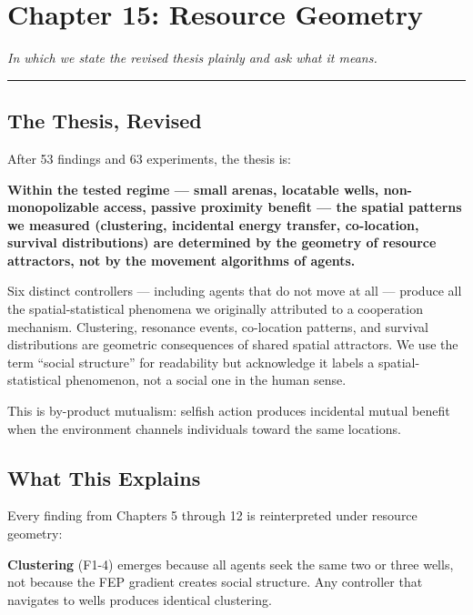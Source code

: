 \chapter{Chapter 15: Resource Geometry}\label{chapter-15-resource-geometry}

\emph{In which we state the revised thesis plainly and ask what it means.}

\begin{center}\rule{0.5\linewidth}{0.5pt}\end{center}

\section{The Thesis, Revised}\label{the-thesis-revised}

After 53 findings and 63 experiments, the thesis is:

\textbf{Within the tested regime --- small arenas, locatable wells, non-monopolizable access, passive proximity benefit --- the spatial patterns we measured (clustering, incidental energy transfer, co-location, survival distributions) are determined by the geometry of resource attractors, not by the movement algorithms of agents.}

Six distinct controllers --- including agents that do not move at all --- produce all the spatial-statistical phenomena we originally attributed to a cooperation mechanism. Clustering, resonance events, co-location patterns, and survival distributions are geometric consequences of shared spatial attractors. We use the term ``social structure'' for readability but acknowledge it labels a spatial-statistical phenomenon, not a social one in the human sense.

This is by-product mutualism: selfish action produces incidental mutual benefit when the environment channels individuals toward the same locations.

\section{What This Explains}\label{what-this-explains}

Every finding from Chapters 5 through 12 is reinterpreted under resource geometry:

\textbf{Clustering} (F1-4) emerges because all agents seek the same two or three wells, not because the FEP gradient creates social structure. Any controller that navigates to wells produces identical clustering.

